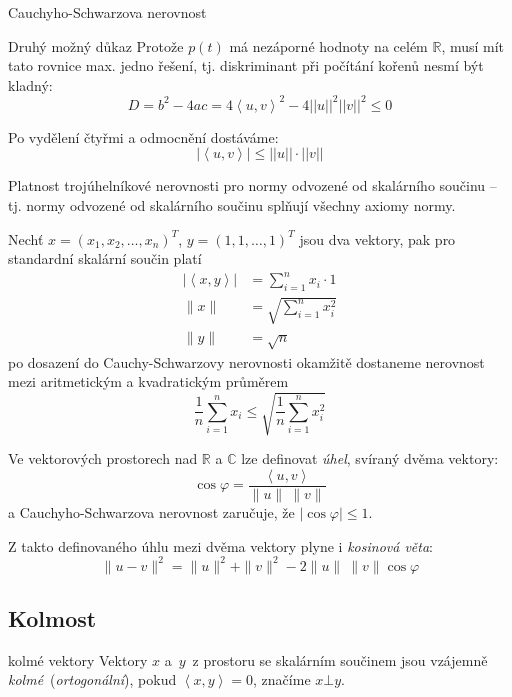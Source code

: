 \begin{vetaN}{Cauchyho-Schwarzova nerovnost}
\begin{obecne}{Druhý možný důkaz}
\noindent
Protože $p(t)$ má nezáporné hodnoty na celém $\mathbb{R}$, musí mít tato rovnice max. jedno řešení, tj. diskriminant při počítání kořenů nesmí být kladný:
$$D=b^2-4ac=4\left<u,v\right>^2-4||u||^2||v||^2\leq 0$$

\noindent
Po vydělení čtyřmi a odmocnění dostáváme:
$$|\left<u,v\right>|\leq ||u||\cdot||v||$$
\end{obecne}

\begin{dusledek}
Platnost trojúhelníkové nerovnosti pro normy odvozené od skalárního součinu -- tj. normy odvozené od skalárního součinu splňují všechny axiomy normy.
\end{dusledek}

\begin{dusledek}
Nechť $x=(x_1,x_2,\dots,x_n)^T$, $y=(1,1,\dots,1)^T$ jsou dva vektory, pak pro standardní skalární součin platí
\begin{align*}
|\left<x,y\right>| &= \sum_{i=1}^n x_i\cdot 1\\
\|x\| &= \sqrt{\sum_{i=1}^n x_i^2}\\
\|y\| &= \sqrt{n}
\end{align*}
po dosazení do Cauchy-Schwarzovy nerovnosti okamžitě dostaneme nerovnost mezi aritmetickým a kvadratickým průměrem
$$\frac{1}{n}\sum_{i=1}^{n} x_i \le \sqrt{\frac{1}{n}\sum_{i=1}^{n} x_i^2}$$
\end{dusledek}



\begin{dusledek}
Ve vektorových prostorech nad $\mathbb{R}$ a $\mathbb{C}$ lze definovat \emph{úhel}, svíraný dvěma vektory: 
$$\cos\varphi = \frac{\left<u,v\right>}{\|u\|\ \|v\|}$$
a Cauchyho-Schwarzova nerovnost zaručuje, že $|\cos\varphi|\leq 1$.
\end{dusledek}

\begin{dusledek}
Z takto definovaného úhlu mezi dvěma vektory plyne i \emph{kosinová věta}: 
$$\|u-v\|^2=\|u\|^2+\|v\|^2-2\|u\|\ \|v\|\cos\varphi$$
\end{dusledek}
\end{vetaN}


\subsection{Kolmost}
\begin{definiceN}{kolmé vektory}
Vektory $x$ a $y$ z prostoru se skalárním součinem jsou vzájemně \emph{kolmé} (\emph{ortogonální}), pokud $\left<x,y\right>=0$, značíme $x \bot y$.
\end{definiceN}

